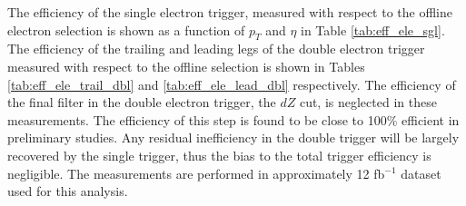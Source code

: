 
The efficiency of the single electron trigger, measured 
with respect to the offline electron selection is shown 
as a function of $p_T$ and $\eta$ in Table \ref{tab:eff_ele_sgl}.
The efficiency of the trailing and leading legs of the double electron trigger
measured with respect to the offline selection is shown
in Tables \ref{tab:eff_ele_trail_dbl} and \ref{tab:eff_ele_lead_dbl} respectively.
The efficiency of the final filter in the double electron trigger, the $dZ$ cut,
is neglected in these measurements.  The efficiency of this step is found to be
close to 100\% efficient in preliminary studies.  Any residual inefficiency
in the double trigger will be largely recovered by the single trigger,
thus the bias to the total trigger efficiency is negligible.
The measurements are performed in approximately 12 fb$^{-1}$ dataset
used for this analysis.

